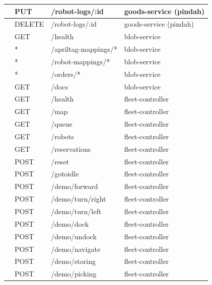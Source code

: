 \begin{xltabular}{\textwidth}{ | >{\raggedright\arraybackslash}p{0.8cm} | >{\raggedright\arraybackslash}p{1.7cm} | >{\raggedright\arraybackslash}p{4.8cm} | >{\raggedright\arraybackslash}X | }
     & PUT & /robot-logs/:id & goods-service (pindah) \\
     & DELETE & /robot-logs/:id & goods-service (pindah) \\
     & GET & /health & blob-service \\
     & * & /apriltag-mappings/* & blob-service \\
     & * & /robot-mappings/* & blob-service \\
     & * & /orders/* & blob-service \\
     & GET & /docs & blob-service \\
     & GET & /health & fleet-controller \\
     & GET & /map & fleet-controller \\
     & GET & /queue & fleet-controller \\
     & GET & /robots & fleet-controller \\
     & GET & /reservations & fleet-controller \\
     & POST & /reset & fleet-controller \\
     & POST & /gotoidle & fleet-controller \\
     & POST & /demo/forward & fleet-controller \\
     & POST & /demo/turn/right & fleet-controller \\
     & POST & /demo/turn/left & fleet-controller \\
     & POST & /demo/dock & fleet-controller \\
     & POST & /demo/undock & fleet-controller \\
     & POST & /demo/navigate & fleet-controller \\
     & POST & /demo/storing & fleet-controller \\
     & POST & /demo/picking & fleet-controller \\
    \hline
\end{xltabular}

